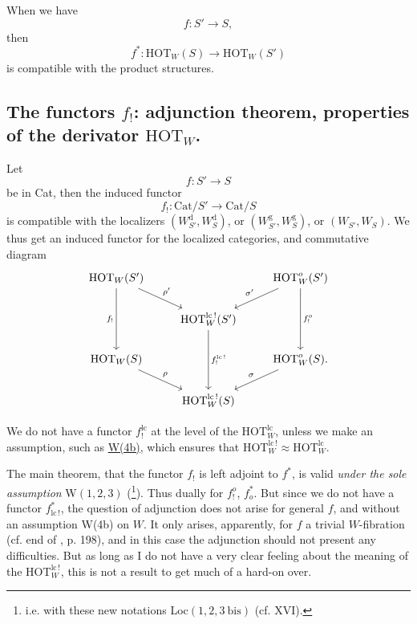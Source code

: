 When we have
\[
f : S' \longrightarrow S,
\]
then
\[
f^* : \mathrm{HOT}_W(S) \longrightarrow \mathrm{HOT}_W(S')
\]
is compatible with the product structures.

\subsection*{\protect{} The functors $f_!$: adjunction theorem, properties of the derivator $\mathrm{HOT}_W$.}

Let
\[
f : S' \longrightarrow S
\]
be in Cat, then the induced functor
\[
f_! : \mathrm{Cat}/S' \longrightarrow \mathrm{Cat}/S
\]
is compatible with the localizers $(W_{S'}^{\mathrm{d}}, W_S^{\mathrm{d}})$, or $(W_{S'}^{\mathrm{g}}, W_S^{\mathrm{g}})$, or $(W_{S'}, W_S)$. We thus get an induced functor for the localized categories, and commutative diagram
\[
\begin{tikzcd}[column sep=small]
\mathrm{HOT}_W(S') \arrow[rrd, "\rho'"] \arrow[dd, "f_!"'] & & & & \mathrm{HOT}^{o}_W(S') \arrow[lld, "\sigma'"'] \arrow[dd, "f^{o}_!"] \\
& & \mathrm{HOT}^{\mathrm{lc}\,!}_W(S') \arrow[dd, "f^{\mathrm{lc}\,!}_!"] & & \\
\mathrm{HOT}_W(S) \arrow[rrd, "\rho"] & & & & \mathrm{HOT}^{o}_W(S). \arrow[lld, "\sigma"'] \\
& & \mathrm{HOT}^{\mathrm{lc}\,!}_W(S) & &
\end{tikzcd}
\]


We do not have a functor $f_!^{\mathrm{lc}}$ at the level of the $\mathrm{HOT}_W^{\mathrm{lc}}$, unless we make an assumption, such as \underline{W(4b)}, which ensures that $\mathrm{HOT}_W^{\mathrm{lc}\,!} \approx \mathrm{HOT}_W^{\mathrm{lc}}$.

The main theorem, that the functor $f_!$ is left adjoint to $f^*$, is valid \textit{under the sole assumption} W$(1,2,3)$ (\footnote{i.e. with these new notations Loc$(1,2,3\ \text{bis})$ (cf. XVI).}). Thus dually for $f_!^{o}$, $f_{o}^*$. But since we do not have a functor $f_{\mathrm{lc}\,!}^*$, the question of adjunction does not arise for general $f$, and without an assumption W(4b) on $W$. It only arises, apparently, for $f$ a trivial $W$-fibration (cf. end of , p. 198), and in this case the adjunction should not present any difficulties. But as long as I do not have a very clear feeling about the meaning of the $\mathrm{HOT}_W^{\mathrm{lc}\,!}$, this is not a result to get much of a hard-on over.

